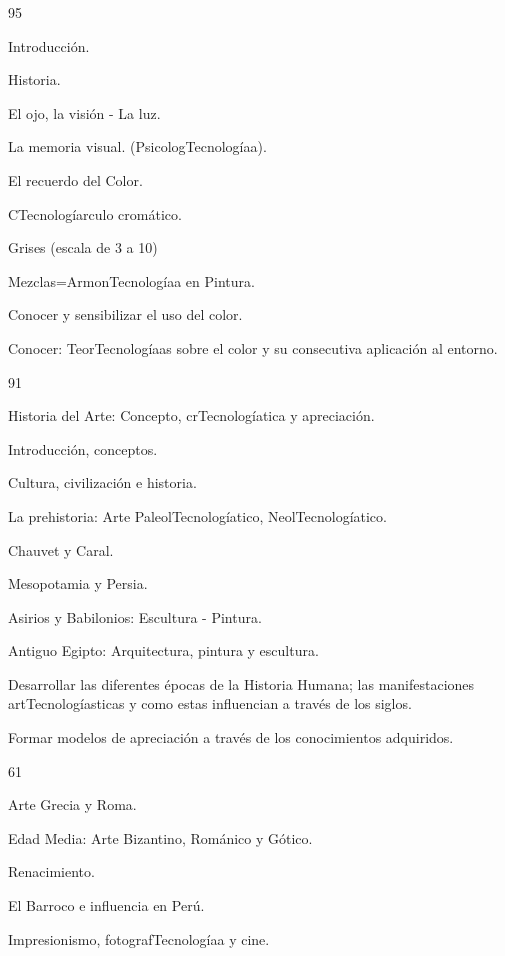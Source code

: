 \begin{syllabus}
\begin{unit}{}{}{9}{5}
\begin{topics}
	\item Introducción.
	\item Historia.
	\item El ojo, la visión - La luz.
	\item La memoria visual. (PsicologTecnologíaa).
	\item El recuerdo del Color.
	\item CTecnologíarculo cromático.
	\item Grises (escala de 3 a 10)
	\item Mezclas=ArmonTecnologíaa en Pintura.
\end{topics}
\begin{learningoutcomes}
	\item Conocer y sensibilizar el uso del color.
	\item Conocer: TeorTecnologíaas sobre el color y su consecutiva aplicación al entorno.
\end{learningoutcomes}
\end{unit}

\begin{unit}{}{}{9}{1}
\begin{topics}
	\item Historia del Arte: Concepto, crTecnologíatica y apreciación.
	\item Introducción, conceptos.
	\item Cultura, civilización e historia.
	\item La prehistoria: Arte PaleolTecnologíatico, NeolTecnologíatico.
	\item Chauvet y Caral.
	\item Mesopotamia y Persia.
	\item Asirios y Babilonios: Escultura - Pintura.
	\item Antiguo Egipto: Arquitectura, pintura y escultura.
\end{topics}
\begin{learningoutcomes}
	\item Desarrollar las diferentes épocas de la Historia Humana; las manifestaciones artTecnologíasticas y como estas influencian a través de los siglos.
	\item Formar modelos de apreciación a través de los conocimientos adquiridos.
\end{learningoutcomes}
\end{unit}

\begin{unit}{}{}{6}{1}
\begin{topics}
	\item Arte Grecia y Roma.
	\item Edad Media: Arte Bizantino, Románico y Gótico.
	\item Renacimiento.
	\item El Barroco e influencia en Perú.
	\item Impresionismo, fotografTecnologíaa y cine.
\end{topics}


\end{unit}
\end{syllabus}
